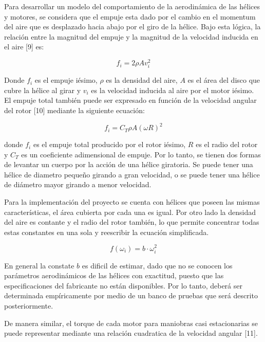\documentclass[../main.tex]{subfiles}
\begin{document}
Para desarrollar un modelo del comportamiento de la aerodinámica de
las hélices y motores, se considera que el empuje esta dado por el
cambio en el momentum del aire que es desplazado hacia abajo por el
giro de la hélice. Bajo esta lógica, la relación entre la magnitud
del empuje y la magnitud de la velocidad inducida en el aire [9] es: 

\begin{equation}
f_{i}=2\rho Av_{i}^{2}
\end{equation}

Donde $f_{i}$ es el empuje iésimo, $\rho$ es la densidad del aire,
$A$ es el área del disco que cubre la hélice al girar y $v_{i}$
es la velocidad inducida al aire por el motor iésimo. 
El empuje total también puede ser expresado en función de la velocidad
angular del rotor [10]  mediante la siguiente ecuación:

\begin{equation}
f_{i}=C_{T}\rho A(\omega R)^{2}
\end{equation}

donde $f_{i}$ es el empuje total producido por el rotor iésimo, $R$
es el radio del rotor y $C_{T}$ es un coeficiente adimensional de
empuje. Por lo tanto, se tienen dos formas de levantar un cuerpo por
la acción de una hélice giratoria. Se puede tener una hélice de diametro
pequeño girando a gran velocidad, o se puede tener una hélice de diámetro
mayor girando a menor velocidad.

Para la implementación del proyecto se cuenta con hélices que poseen
las mismas características, el área cubierta por cada una es igual.
Por otro lado la densidad del aire es contante y el radio del rotor
también, lo que permite concentrar todas estas constantes en una sola
y reescribir la ecuación simplificada.

\begin{equation}
f(\omega_{i})=b\cdot\omega_{i}^{2}
\end{equation}

En general la constate $b$ es dificil de estimar, dado que no se
conocen los parámetros aerodinámicos de las hélices con exactitud,
puesto que las especificaciones del fabricante no están disponibles.
Por lo tanto, deberá ser determinada empíricamente por medio de un
banco de pruebas que será descrito posteriormente.

De manera similar, el torque de cada motor para maniobras casi estacionarias
se puede representar mediante una relación cuadratica de la velocidad
angular [11].
\end{document}
